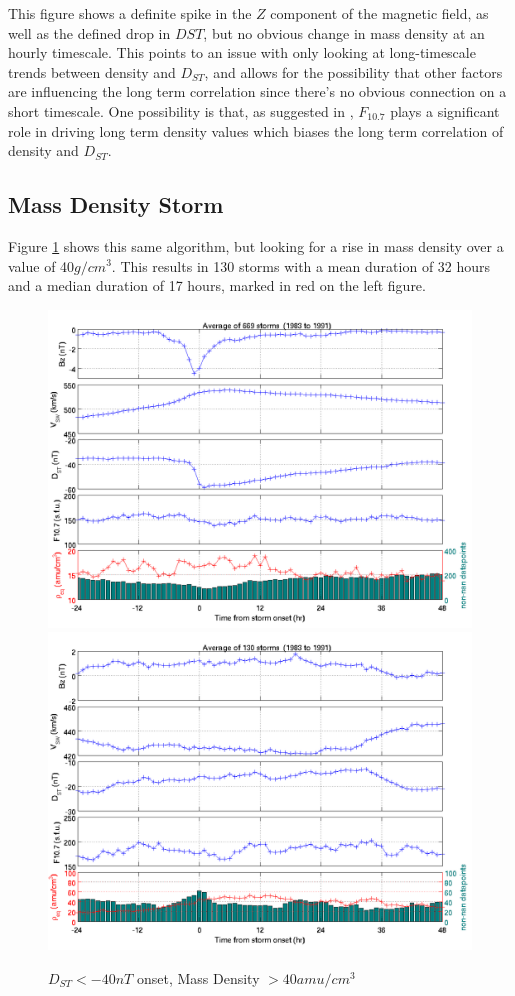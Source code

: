 \documentclass[10pt,twocolumn]{article}
\begin{document}
This figure shows a definite spike in the $Z$ component of the magnetic field, as well as the defined drop in $DST$, but no obvious change in mass density at an hourly timescale. This points to an issue with only looking at long-timescale trends between density and $D_{ST}$, and allows for the possibility that other factors are influencing the long term correlation since there's no obvious connection on a short timescale. One possibility is that, as suggested in \cite{Takahashi2010}, $F_{10.7}$ plays a significant role in driving long term density values which biases the long term correlation of density and $D_{ST}$.

\subsection{Mass Density Storm}
Figure \ref{MassStorm} shows this same algorithm, but looking for a rise in mass density over a value of 40$g/cm^3$. This results in 130 storms with a mean duration of 32 hours and a median duration of 17 hours, marked in red on the left figure.

\begin{figure}[htp!]
\centering
\includegraphics[scale=0.35]{paperfigures/stormavs-dst.png}
\includegraphics[scale=0.35]{paperfigures/stormavs-mass.png}
\caption{$D_{ST}<-40nT$ onset, Mass Density $>40 amu/cm^3$}
\label{MassStorm}
\end{figure}
\end{document}
